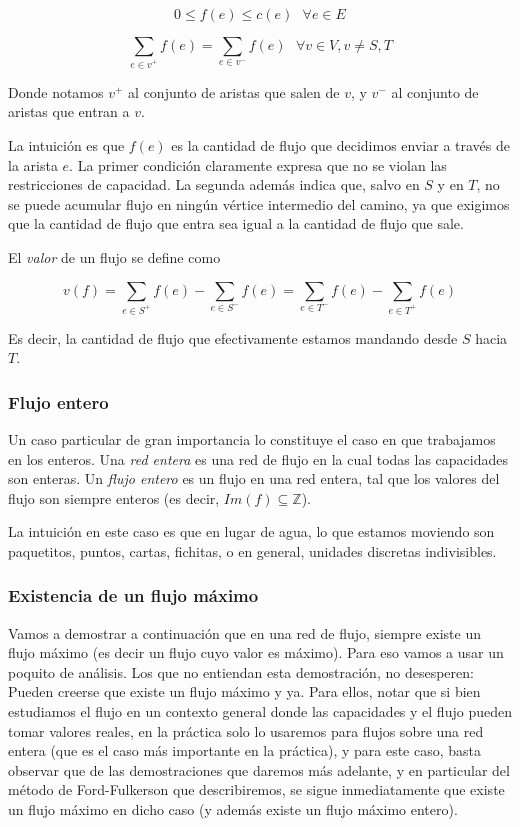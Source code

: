 \documentclass{article}
\begin{document}
$$0 \leq f(e) \leq c(e)\ \ \ \forall e \in E$$

$$\sum_{e \in v^+}{f(e)} = \sum_{e \in v^-}{f(e)}\ \ \  \forall v \in V, v \neq S,T$$

Donde notamos $v^+$ al conjunto de aristas que salen de $v$, y $v^-$ al conjunto de aristas que entran a $v$.

La intuición es que $f(e)$ es la cantidad de flujo que decidimos enviar a través de la arista $e$. La primer condición claramente expresa que no
se violan las restricciones de capacidad. La segunda además indica que, salvo en $S$ y en $T$, no se puede acumular flujo en ningún vértice
intermedio del camino, ya que exigimos que la cantidad de flujo que entra sea igual a la cantidad de flujo que sale.

El \textit{valor} de un flujo se define como

$$v(f) = \sum_{e \in S^+}{f(e)} - \sum_{e \in S^-}{f(e)} = \sum_{e \in T^-}{f(e)} - \sum_{e \in T^+}{f(e)}$$

Es decir, la cantidad de flujo que efectivamente estamos mandando desde $S$ hacia $T$.

\subsubsection{Flujo entero}

Un caso particular de gran importancia lo constituye el caso en que trabajamos en los enteros. Una \textit{red entera} es una red de flujo en
la cual todas las capacidades son enteras. Un \textit{flujo entero} es un flujo en una red entera, tal que los valores del flujo son siempre
enteros (es decir, $Im(f) \subseteq \mathbb{Z}$).

La intuición en este caso es que en lugar de agua, lo que estamos moviendo son paquetitos, puntos, cartas, fichitas, o en general,
unidades discretas indivisibles.

\subsubsection{Existencia de un flujo máximo}

Vamos a demostrar a continuación que en una red de flujo, siempre existe un flujo máximo (es decir un flujo cuyo valor es máximo).
Para eso vamos a usar un poquito de análisis. Los que no entiendan esta demostración, no desesperen: 
Pueden creerse que existe un flujo máximo y ya. Para ellos, notar que si bien estudiamos el flujo en un contexto general donde las
capacidades y el flujo pueden tomar valores reales, en la práctica solo lo usaremos para flujos sobre una red entera (que es
el caso más importante en la práctica), y para este caso, basta observar que de las demostraciones que daremos más adelante, y en particular
del método de Ford-Fulkerson que describiremos, se sigue inmediatamente que existe un flujo máximo en dicho caso (y además existe un flujo máximo entero).
\end{document}
